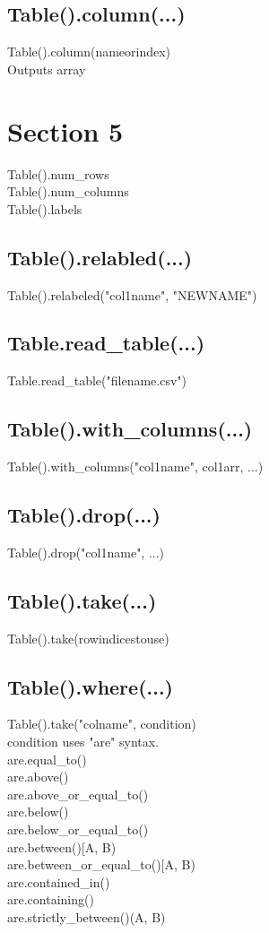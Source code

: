 \documentclass[10pt, a4paper, twocolumn]{article}
\begin{document}
    \subsection{Table().column(...)}
    Table().column(nameorindex)\\
    Outputs array\\


    \section{Section 5}
    Table().num\_rows\\
    Table().num\_columns\\
    Table().labels\\
    \subsection{Table().relabled(...)}
    Table().relabeled("col1name", "NEWNAME")
    \subsection{Table.read\_table(...)}
    Table.read\_table("filename.csv")\\
    \subsection{Table().with\_columns(...)}
    Table().with\_columns("col1name", col1arr, ...)\\
    \subsection{Table().drop(...)}
    Table().drop("col1name", ...)\\
    \subsection{Table().take(...)}
    Table().take(rowindicestouse)\\
    \subsection{Table().where(...)}
    Table().take("colname", condition)\\
    condition uses "are" syntax.\\
    are.equal\_to()\\
    are.above()\\
    are.above\_or\_equal\_to()\\
    are.below()\\
    are.below\_or\_equal\_to()\\
    are.between()\quad [A, B)\\
    are.between\_or\_equal\_to()\quad [A, B)\\
    are.contained\_in()\\
    are.containing()\\
    are.strictly\_between()\quad (A, B)\\
\end{document}
